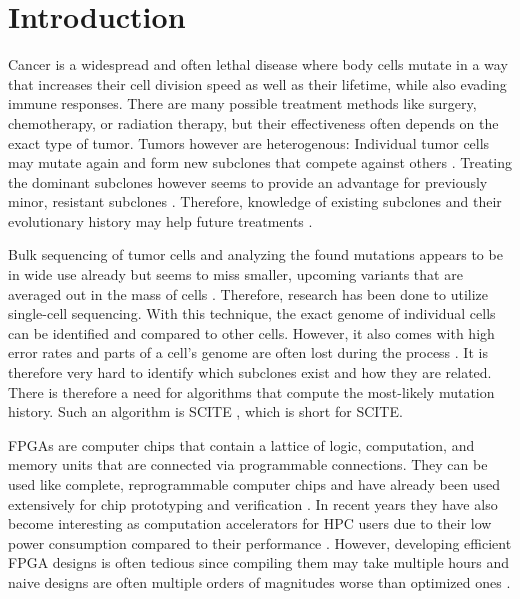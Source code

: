 \chapter{Introduction}
\label{ch:introduction}

Cancer is a widespread and often lethal disease\cite{10.1001/jamaoncol.2021.6987} where body cells mutate in a way that increases their cell division speed as well as their lifetime, while also evading immune responses. There are many possible treatment methods like surgery, chemotherapy, or radiation therapy, but their effectiveness often depends on the exact type of tumor. Tumors however are heterogenous: Individual tumor cells may mutate again and form new subclones that compete against others \cite{nik2012life}. Treating the dominant subclones however seems to provide an advantage for previously minor, resistant subclones \cite{gillies2012evolutionary}. Therefore, knowledge of existing subclones and their evolutionary history may help future treatments \cite{greaves2012clonal, stratton2009cancer, swanton2012intratumor}.

Bulk sequencing of tumor cells and analyzing the found mutations appears to be in wide use already but seems to miss smaller, upcoming variants that are averaged out in the mass of cells \cite{navin2014cancer}. Therefore, research has been done to utilize single-cell sequencing. With this technique, the exact genome of individual cells can be identified and compared to other cells. However, it also comes with high error rates and parts of a cell's genome are often lost during the process \cite{tree2016}. It is therefore very hard to identify which subclones exist and how they are related. There is therefore a need for algorithms that compute the most-likely mutation history. Such an algorithm is \acs{SCITE} \cite{tree2016}, which is short for \acl{SCITE}.

\acp{FPGA} are computer chips that contain a lattice of logic, computation, and memory units that are connected via programmable connections. They can be used like complete, reprogrammable computer chips and have already been used extensively for chip prototyping and verification \cite{rodriguez2007features}. In recent years they have also become interesting as computation accelerators for \ac{HPC} users due to their low power consumption compared to their performance \cite{betkaoui2010comparing}. However, developing efficient \ac{FPGA} designs is often tedious since compiling them may take multiple hours and naive designs are often multiple orders of magnitudes worse than optimized ones \cite{betkaoui2010comparing}.

